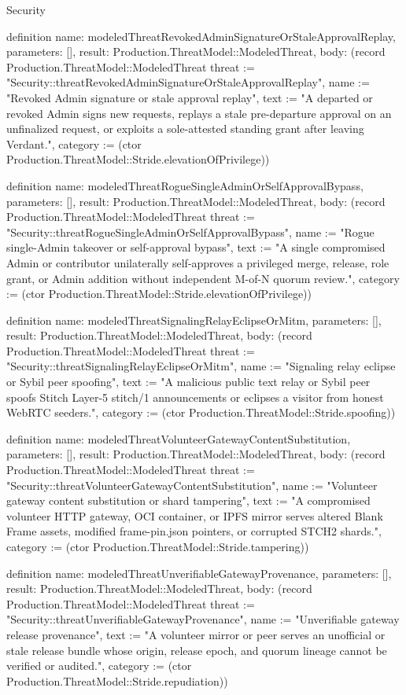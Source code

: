 \begin{lexlean}{Security}
\begin{semanticmodule}
definition{
  name: modeledThreatRevokedAdminSignatureOrStaleApprovalReplay,
  parameters: [],
  result: Production.ThreatModel::ModeledThreat,
  body: (record Production.ThreatModel::ModeledThreat {threat := "Security::threatRevokedAdminSignatureOrStaleApprovalReplay", name := "Revoked Admin signature or stale approval replay", text := "A departed or revoked Admin signs new requests, replays a stale pre-departure approval on an unfinalized request, or exploits a sole-attested standing grant after leaving Verdant.", category := (ctor Production.ThreatModel::Stride.elevationOfPrivilege)})
}

definition{
  name: modeledThreatRogueSingleAdminOrSelfApprovalBypass,
  parameters: [],
  result: Production.ThreatModel::ModeledThreat,
  body: (record Production.ThreatModel::ModeledThreat {threat := "Security::threatRogueSingleAdminOrSelfApprovalBypass", name := "Rogue single-Admin takeover or self-approval bypass", text := "A single compromised Admin or contributor unilaterally self-approves a privileged merge, release, role grant, or Admin addition without independent M-of-N quorum review.", category := (ctor Production.ThreatModel::Stride.elevationOfPrivilege)})
}

definition{
  name: modeledThreatSignalingRelayEclipseOrMitm,
  parameters: [],
  result: Production.ThreatModel::ModeledThreat,
  body: (record Production.ThreatModel::ModeledThreat {threat := "Security::threatSignalingRelayEclipseOrMitm", name := "Signaling relay eclipse or Sybil peer spoofing", text := "A malicious public text relay or Sybil peer spoofs Stitch Layer-5 stitch/1 announcements or eclipses a visitor from honest WebRTC seeders.", category := (ctor Production.ThreatModel::Stride.spoofing)})
}

definition{
  name: modeledThreatVolunteerGatewayContentSubstitution,
  parameters: [],
  result: Production.ThreatModel::ModeledThreat,
  body: (record Production.ThreatModel::ModeledThreat {threat := "Security::threatVolunteerGatewayContentSubstitution", name := "Volunteer gateway content substitution or shard tampering", text := "A compromised volunteer HTTP gateway, OCI container, or IPFS mirror serves altered Blank Frame assets, modified frame-pin.json pointers, or corrupted STCH2 shards.", category := (ctor Production.ThreatModel::Stride.tampering)})
}

definition{
  name: modeledThreatUnverifiableGatewayProvenance,
  parameters: [],
  result: Production.ThreatModel::ModeledThreat,
  body: (record Production.ThreatModel::ModeledThreat {threat := "Security::threatUnverifiableGatewayProvenance", name := "Unverifiable gateway release provenance", text := "A volunteer mirror or peer serves an unofficial or stale release bundle whose origin, release epoch, and quorum lineage cannot be verified or audited.", category := (ctor Production.ThreatModel::Stride.repudiation)})
}


\end{semanticmodule}
\end{lexlean}
